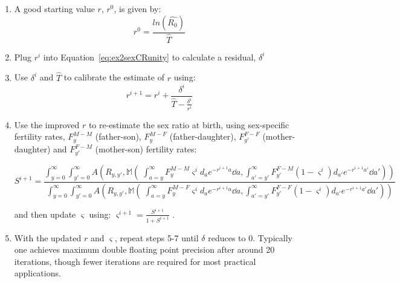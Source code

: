 \begin{enumerate}
  \item A good starting value $r$, $r^0$, is given by:
   \begin{equation}
   r^0 = \frac{ln(\widehat{R_0})}{\widehat{T}}
   \end{equation}
  \item Plug $r^i$ into Equation~\ref{eq:ex2sexCRunity} to calculate a
  residual, $\delta^i$
  \item Use $\delta^i$ and $\widehat{T}$ to calibrate the estimate of $r$
  using:
  \begin{equation}
  r^{i+1} = r^i + \frac{\delta^i}{\widehat{T} - \frac{\delta^i}{r^i}}
  \end{equation}
  \item Use the improved $r$ to re-estimate the sex ratio at birth, using
  sex-specific fertility rates, $F_y^{M-M}$ (father-son), $F_y^{M-F}$
  (father-daughter), $F_{y'}^{F-F}$ (mother-daughter) and $F_{y'}^{F-M}$
  (mother-son) fertility rates:
  \begin{adjustwidth}{-1in}{0in}
  \begin{equation}
  S^{i+1} = \frac{\int_{y=0}^\infty \int_{y'=0}^\infty
A\left(R_{y,y'},\mathbb{M}\left(\;\int_{a=y}^\infty F_y^{M-M} \varsigma^i
d_ae^{-r^{i+1}a} \dd a, \int _{a'=y'}^\infty F_{y'}^{F-M} (1-\varsigma^i)
d_{a'}e^{-r^{i+1}a'} \dd a'\right)\right)}{\int_{y=0}^\infty \int_{y'=0}^\infty
A\left(R_{y,y'}, \mathbb{M}\left(\;\int_{a=y}^\infty F_y^{M-F} \varsigma^i d_a
e^{-r^{i+1}a} \dd a, \int _{a'=y'}^\infty F_{y'}^{F-F} (1-\varsigma^i)
d_{a'}e^{-r^{i+1}a'} \dd a'\right)\right)}
  \end{equation}
  \end{adjustwidth}
  and then update $\varsigma$ using: $\varsigma^{i+1} =
  \frac{S^{i+1}}{1+S^{i+1}}$ .
  \item With the updated $r$ and $\varsigma$, repeat steps 5-7 until $\delta$
  reduces to 0. Typically one achieves maximum double floating point precision
  after around 20 iterations, though fewer iterations are required for
  most practical applications.
\end{enumerate}











